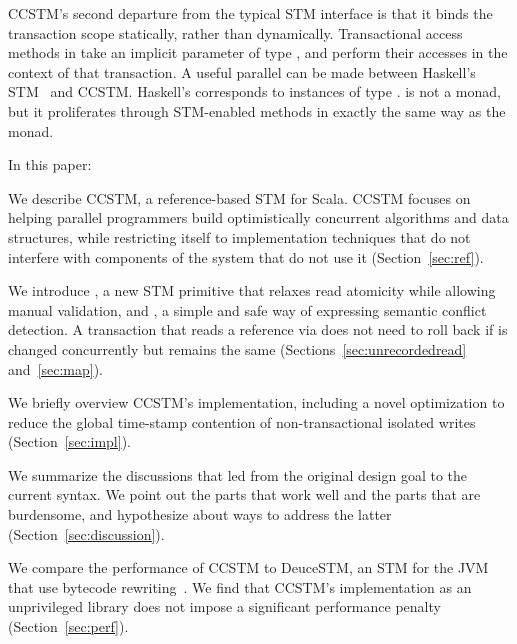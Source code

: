 CCSTM's second departure from the typical STM interface is that it binds the
transaction scope statically, rather than dynamically.  Transactional access
methods in  take an implicit parameter of type , and
perform their accesses in the context of that transaction.
A useful parallel can be made between Haskell's STM~\cite{harris05composable} and CCSTM.
Haskell's  corresponds to instances of type .
 is not a monad, but it proliferates through STM-enabled
methods in exactly the same way as the  monad.

In this paper:
\begin{packed_enum}

\item We describe CCSTM, a reference-based STM for Scala.  CCSTM focuses on
helping parallel programmers build optimistically concurrent algorithms
and data structures, while restricting itself to implementation techniques
that do not interfere with components of the system that do not use it
(Section~\ref{sec:ref}).

\item We introduce , a new STM primitive that relaxes
read atomicity while allowing manual validation, and , a simple
and safe way of expressing semantic conflict detection.  A transaction
that reads a reference  via  does not need to roll
back if  is changed concurrently but  remains
the same (Sections~\ref{sec:unrecordedread} and~\ref{sec:map}).

\item We briefly overview CCSTM's implementation, including a
novel optimization to reduce the global time-stamp contention of
non-transactional isolated writes (Section~\ref{sec:impl}).

\item We summarize the discussions that led from the original design goal to
the current syntax.  We point out the parts that work well and the parts that
are burdensome, and hypothesize about ways to address the latter
(Section~\ref{sec:discussion}).  

\item We compare the performance of CCSTM to DeuceSTM, an STM for
the JVM that use bytecode rewriting~\cite{deucestm}.
We find that CCSTM's implementation as an
unprivileged library does not impose a significant performance penalty
(Section~\ref{sec:perf}).

\end{packed_enum}

